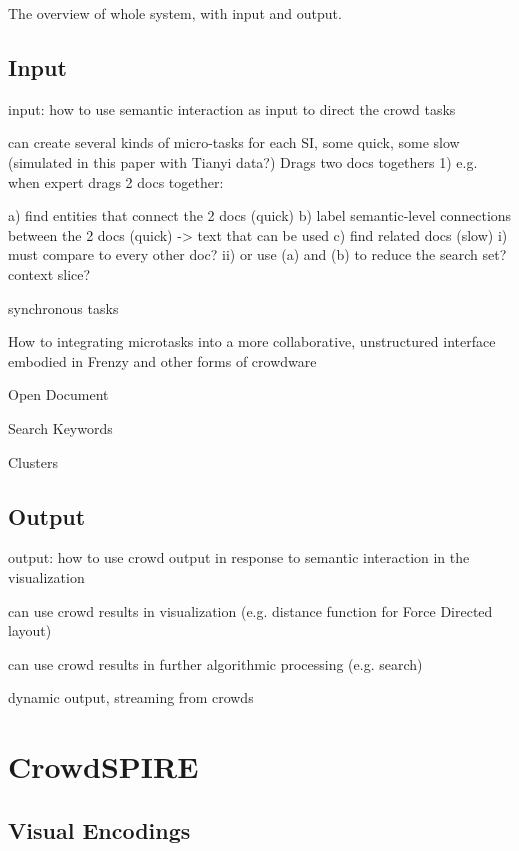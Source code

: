 \documentclass[journal]{vgtc}                %
\begin{document}
The overview of whole system, with input and output.

\subsection{Input}

input:  how to use semantic interaction as input to direct the crowd tasks

can create several kinds of micro-tasks for each SI, some quick, some slow  (simulated in this paper with Tianyi data?) \newline 
Drags two docs togethers
1) e.g. when expert drags 2 docs together:

a) find entities that connect the 2 docs (quick)
b) label semantic-level connections between the 2 docs (quick) -> text that can be used
c) find related docs (slow)
i) must compare to every other doc?
ii) or use (a) and (b) to reduce the search set?  context slice?\newline 


synchronous tasks

How to integrating microtasks into a more collaborative, unstructured interface embodied in Frenzy and other forms of crowdware




Open Document

Search Keywords\newline 

Clusters \newline 


\subsection{Output}

output:  how to use crowd output in response to semantic interaction in the visualization

can use crowd results in visualization (e.g. distance function for Force Directed layout)

can use crowd results in further algorithmic processing (e.g. search)

dynamic output, streaming from crowds


\section{CrowdSPIRE}

\subsection{Visual Encodings}
\end{document}
